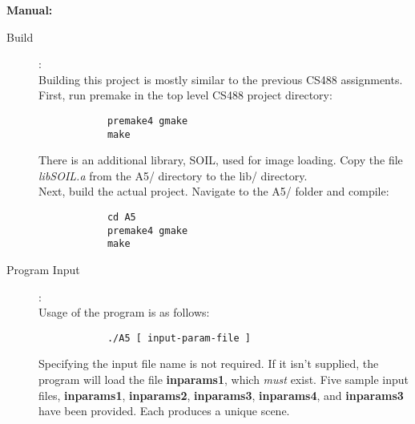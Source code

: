\documentclass{article}
\begin{document}
\Large\textbf{Manual:}
\normalsize
	\begin{description}
	\item[Build]:\\
		Building this project is mostly similar to the previous CS488 assignments. First, run premake in the top level CS488 project directory:
		\begin{verbatim}
			premake4 gmake
			make
		\end{verbatim}
		There is an additional library, SOIL, used for image loading. Copy the file \textit{libSOIL.a} from the A5/ directory to the lib/ directory. \\
		Next, build the actual project. Navigate to the A5/ folder and compile:
		\begin{verbatim}
			cd A5
			premake4 gmake
			make
		\end{verbatim}

	\item[Program Input]:\\
		Usage of the program is as follows:
		\begin{verbatim}
			./A5 [ input-param-file ]
		\end{verbatim}
		Specifying the input file name is not required. If it isn't supplied, the program will load the file \textbf{inparams1}, which \textit{must} exist. Five sample input files, \textbf{inparams1}, \textbf{inparams2}, \textbf{inparams3}, \textbf{inparams4}, and \textbf{inparams3} have been provided. Each produces a unique scene.


\end{description}
\end{document}
